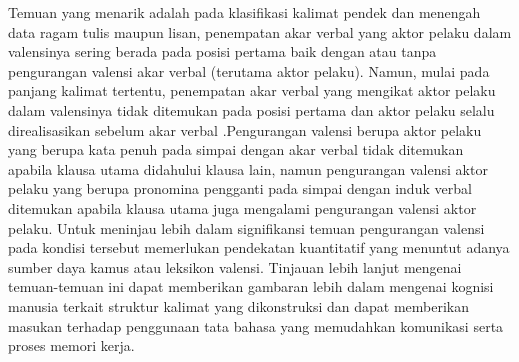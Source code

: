 Temuan yang menarik adalah pada klasifikasi kalimat pendek dan menengah data ragam tulis maupun lisan, penempatan akar verbal yang aktor pelaku dalam valensinya sering berada pada posisi pertama baik dengan atau tanpa pengurangan valensi akar verbal (terutama aktor pelaku). Namun, mulai pada panjang kalimat tertentu, penempatan akar verbal yang mengikat aktor pelaku dalam valensinya tidak ditemukan pada posisi pertama dan aktor pelaku selalu direalisasikan sebelum akar verbal .Pengurangan valensi berupa aktor pelaku yang berupa kata penuh pada simpai dengan akar verbal tidak ditemukan apabila klausa utama didahului klausa lain, namun pengurangan valensi aktor pelaku yang berupa pronomina pengganti pada simpai dengan induk verbal ditemukan apabila klausa utama juga mengalami pengurangan valensi aktor pelaku. Untuk meninjau lebih dalam signifikansi temuan pengurangan valensi pada kondisi tersebut memerlukan pendekatan kuantitatif yang menuntut adanya sumber daya kamus atau leksikon valensi. Tinjauan lebih lanjut mengenai temuan-temuan ini dapat memberikan gambaran lebih dalam mengenai kognisi manusia terkait struktur kalimat yang dikonstruksi dan dapat memberikan masukan terhadap penggunaan tata bahasa yang memudahkan komunikasi serta proses memori kerja.

